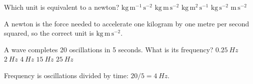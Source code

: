 \documentclass[student,print,12pt,a4paper]{physicsquiz}
\begin{document}
\makequiztitle

\begin{quizbank}
  \begin{quizquestion}[
    id=starter-units-001,
    topic=units,
    difficulty=foundation,
    marks=1,
    correct=B,
    tags={units,measurement},
    outcome={Identify a derived SI unit}
  ]
    Which unit is equivalent to a newton?
    \choices
      {\(\mathrm{kg\,m^{-1}\,s^{-2}}\)}
      {\(\mathrm{kg\,m\,s^{-2}}\)}
      {\(\mathrm{kg\,m^2\,s^{-1}}\)}
      {\(\mathrm{kg\,s^{-2}}\)}
      {\(\mathrm{m\,s^{-2}}\)}
  \end{quizquestion}
  \begin{quizsolution}
    A newton is the force needed to accelerate one kilogram by one metre per
    second squared, so the correct unit is \(\mathrm{kg\,m\,s^{-2}}\).
  \end{quizsolution}

  \begin{quizquestion}[
    id=starter-waves-001,
    topic=waves,
    difficulty=applied,
    marks=0.5,
    correct=C,
    tags={waves,frequency}
  ]
    A wave completes 20 oscillations in 5 seconds. What is its frequency?
    \choices
      {\(\SI{0.25}{Hz}\)}
      {\(\SI{2}{Hz}\)}
      {\(\SI{4}{Hz}\)}
      {\(\SI{15}{Hz}\)}
      {\(\SI{25}{Hz}\)}
  \end{quizquestion}
  \begin{quizsolution}
    Frequency is oscillations divided by time: \(20/5=\SI{4}{Hz}\).
  \end{quizsolution}
\end{quizbank}

\quizselectall

\begin{quizquestioncontent}
  \printquizquestions
\end{quizquestioncontent}

\begin{quizanswerkeycontent}
  \printquizanswerkey
\end{quizanswerkeycontent}

\begin{quizsolutioncontent}
  \printquizsolutions
\end{quizsolutioncontent}
\end{document}
